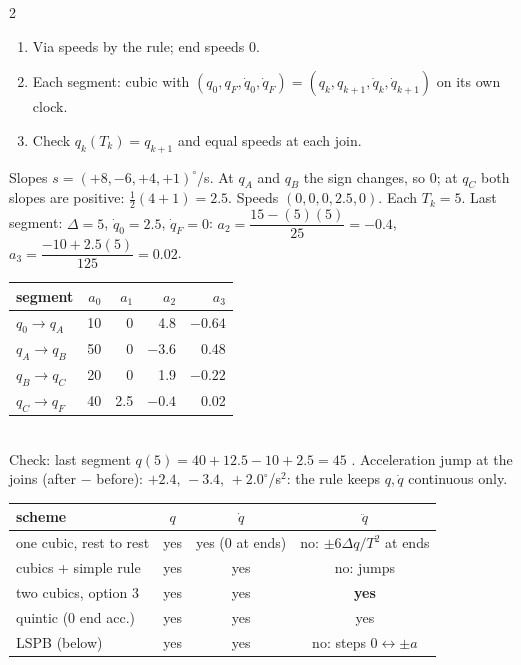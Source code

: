 \begin{multicols}{2}
\begin{recipe}
\begin{enumerate}
\item Via speeds by the rule; end speeds $0$.
\item Each segment: cubic with $(q_0,q_F,\dot q_0,\dot q_F)=(q_k,q_{k+1},\dot q_k,\dot q_{k+1})$ on its own clock.
\item Check $q_k(T_k)=q_{k+1}$ and equal speeds at each join.
\end{enumerate}
\end{recipe}
\begin{worked}[notebook Q2: $q=10,50,20,40,45^\circ$ at $t=0,5,10,15,20$\,s]
Slopes $s=(+8,-6,+4,+1)^\circ$/s. At $q_A$ and $q_B$ the sign changes, so $0$; at $q_C$ both slopes are positive: $\tfrac12(4+1)=2.5$. Speeds $(0,0,0,2.5,0)$. Each $T_k=5$. Last segment: $\Delta=5$, $\dot q_0=2.5$, $\dot q_F=0$: $a_2=\dfrac{15-(5)(5)}{25}=-0.4$, $a_3=\dfrac{-10+2.5(5)}{125}=0.02$.\\
\begin{tabular}{@{}lrrrr@{}}\toprule segment&$a_0$&$a_1$&$a_2$&$a_3$\\\midrule
$q_0\to q_A$&10&0&4.8&$-0.64$\\$q_A\to q_B$&50&0&$-3.6$&0.48\\$q_B\to q_C$&20&0&1.9&$-0.22$\\$q_C\to q_F$&40&2.5&$-0.4$&0.02\\\bottomrule\end{tabular}\\
Check: last segment $q(5)=40+12.5-10+2.5=45$ \checkmark. Acceleration jump at the joins (after $-$ before): $+2.4,\,-3.4,\,+2.0^\circ$/s$^2$: the rule keeps $q,\dot q$ continuous only. \chk
\end{worked}
\nopagebreak[4]
\par\begin{tabularx}{\linewidth}{@{}>{\raggedright\arraybackslash}Xccc@{}}\toprule
 scheme & $q$ & $\dot q$ & $\ddot q$\\\midrule
 one cubic, rest to rest & yes & yes (0 at ends) & no: $\pm6\Delta q/T^2$ at ends\\
 cubics + simple rule & yes & yes & no: jumps\\
 two cubics, option 3 & yes & yes & \textbf{yes}\\
 quintic (0 end acc.) & yes & yes & yes\\
 LSPB (below) & yes & yes & no: steps $0\leftrightarrow\pm a$\\\bottomrule
\end{tabularx}


\end{multicols}
